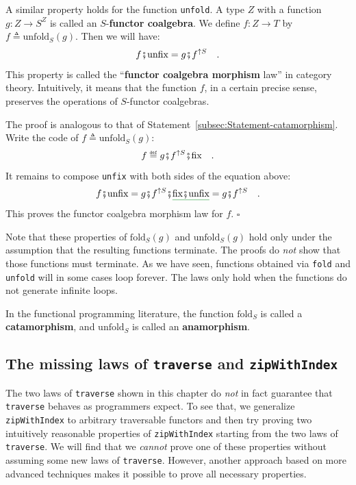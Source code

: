 A similar property holds for the function \lstinline!unfold!. A type
$Z$ with a function $g:Z\rightarrow S^{Z}$ is called an
$S$-\textbf{functor coalgebra}. We define $f:Z\rightarrow T$ by
$f\triangleq\text{unfold}_{S}(g)$. Then we will have:
\[
f\bef\text{unfix}=g\bef f^{\uparrow S}\quad.
\]
This property is called the \textsf{``}\textbf{functor
coalgebra morphism} law\textsf{''} in category theory. Intuitively, it means
that the function $f$, in a certain precise sense, preserves the
operations of $S$-functor coalgebras. 

The proof is analogous to that of Statement~\ref{subsec:Statement-catamorphism}.
Write the code of $f\triangleq\text{unfold}_{S}(g)$:
\[
f\triangleq g\bef f^{\uparrow S}\bef\text{fix}\quad.
\]
It remains to compose \lstinline!unfix! with both sides of the equation
above:
\[
f\bef\text{unfix}=g\bef f^{\uparrow S}\bef\gunderline{\text{fix}\bef\text{unfix}}=g\bef f^{\uparrow S}\quad.
\]
This proves the functor coalgebra morphism law for $f$. $\square$

Note that these properties of $\text{fold}_{S}(g)$ and $\text{unfold}_{S}(g)$
hold only under the assumption that the resulting functions terminate.
The proofs do \emph{not} show that those functions must terminate.
As we have seen, functions obtained via \lstinline!fold! and \lstinline!unfold!
will in some cases loop forever. The laws only hold when the functions
do not generate infinite loops.

In the functional programming literature, the function $\text{fold}_{S}$
is called a \textbf{catamorphism}, and $\text{unfold}_{S}$
is called an \textbf{anamorphism}.

\subsection{The missing laws of \texttt{traverse} and \texttt{zipWithIndex}\label{subsec:Laws-of-traverse-and-zipWithIndex}}

The two laws of \lstinline!traverse! shown in this chapter do \emph{not}
in fact guarantee that \lstinline!traverse! behaves as programmers
expect. To see that, we generalize \lstinline!zipWithIndex! to arbitrary
traversable functors and then try proving two intuitively reasonable
properties of \lstinline!zipWithIndex! starting from the two laws
of \lstinline!traverse!. We will find that we \emph{cannot} prove
one of these properties without assuming some new laws of \lstinline!traverse!.
However, another approach based on more advanced techniques makes
it possible to prove all necessary properties. 

